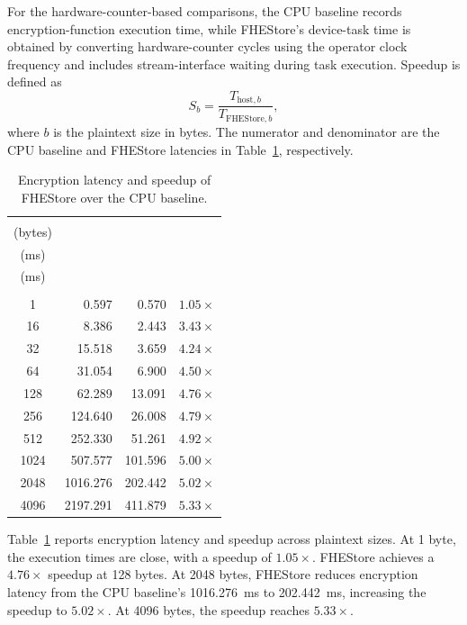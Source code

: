 \documentclass[sigconf,anonymous,balance=false]{acmart}
\newcommand{\bodypar}{\par\vskip 0pt plus 6pt\relax}
\begin{document}
For the hardware-counter-based comparisons, the CPU baseline records encryption-function execution time, while FHEStore's device-task time is obtained by converting hardware-counter cycles using the operator clock frequency and includes stream-interface waiting during task execution. Speedup is defined as
\begin{equation}
  S_b = \frac{T_{\mathrm{host},b}}{T_{\mathrm{FHEStore},b}},
  \label{eq:speedup}
\end{equation}
where $b$ is the plaintext size in bytes. The numerator and denominator are the CPU baseline and FHEStore latencies in Table~\ref{tab:results}, respectively.
\bodypar

\begin{table}[!tbp]
  \centering
  \caption{Encryption latency and speedup of FHEStore over the CPU baseline.}
  \label{tab:results}
  \small
  \renewcommand{\arraystretch}{1.16}
  \setlength{\tabcolsep}{4pt}
  \begin{tabular*}{\columnwidth}{@{\extracolsep{\fill}}crrc@{}}
    \toprule
    \shortstack{\textbf{Plaintext Size}\\(bytes)} & \shortstack{\textbf{CPU baseline}\\(ms)} & \shortstack{\textbf{FHEStore}\\(ms)} & \shortstack{\textbf{Speedup}\\\phantom{(ms)}} \\
    \midrule
    1 & 0.597 & 0.570 & $1.05\times$ \\
    16 & 8.386 & 2.443 & $3.43\times$ \\
    32 & 15.518 & 3.659 & $4.24\times$ \\
    64 & 31.054 & 6.900 & $4.50\times$ \\
    128 & 62.289 & 13.091 & $4.76\times$ \\
    256 & 124.640 & 26.008 & $4.79\times$ \\
    512 & 252.330 & 51.261 & $4.92\times$ \\
    1024 & 507.577 & 101.596 & $5.00\times$ \\
    2048 & 1016.276 & 202.442 & $5.02\times$ \\
    4096 & 2197.291 & 411.879 & $5.33\times$ \\
    \bottomrule
  \end{tabular*}
\end{table}

Table~\ref{tab:results} reports encryption latency and speedup across plaintext sizes. At 1 byte, the execution times are close, with a speedup of $1.05\times$. FHEStore achieves a $4.76\times$ speedup at 128 bytes. At 2048 bytes, FHEStore reduces encryption latency from the CPU baseline's 1016.276~ms to 202.442~ms, increasing the speedup to $5.02\times$. At 4096 bytes, the speedup reaches $5.33\times$.
\bodypar
\end{document}
